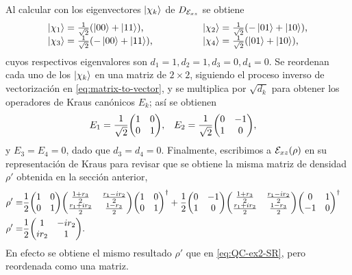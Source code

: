 Al calcular con los eigenvectores $\ket{\chi_k}$ de $D_{\mathcal{E}_{xz}}$ se obtiene
\begin{align}
\begin{tabular}{lcl}
$\ket{\chi_1}=\frac{1}{\sqrt{2}}\qty(\ket{00}+\ket{11})$, & \hspace{1cm}
& $ \ket{\chi_{2}}=\frac{1}{\sqrt{2}}\qty(-\ket{01}+\ket{10})$, \\
$\ket{\chi_{3}}=\frac{1}{\sqrt{2}}\qty(-\ket{00}+\ket{11})$, & \hspace{1cm}
& $\ket{\chi_4}=\frac{1}{\sqrt{2}}\qty(\ket{01}+\ket{10})$,
\end{tabular}
\end{align}
cuyos respectivos eigenvalores son $d_1=1,d_2=1,d_3=0,d_4=0$. 
Se reordenan cada uno de los $\ket{\chi_k}$ en una matriz
de $2\times2$, siguiendo el proceso inverso de vectorización
en \eqref{eq:matrix-to-vector}, y se multiplica por $\sqrt{d_k}$ 
para obtener los operadores de Kraus canónicos $E_k$; así se obtienen
\begin{align}
E_1&=
\frac{1}{\sqrt{2}}
\mqty(
1 & 0\\
0 & 1
),
&
E_2&=
\frac{1}{\sqrt{2}}
\mqty(
0 & -1\\
1 & 0
),
\end{align}
y $E_3=E_4=0$, dado que $d_3=d_4=0$. 
Finalmente, escribimos a $\mathcal{E}_{xz}\qty(\rho)$ en su representación 
de Kraus para revisar que se obtiene la misma matriz
de densidad $\rho'$ obtenida en la sección anterior,
\begin{align}
\rho'=&
\frac{1}{2}
\mqty(
1 & 0\\
0 & 1
)
\mqty(
\frac{1+r_3}{2}& \frac{r_1-ir_2}{2}\\
\frac{r_1+ir_2}{2} & \frac{1-r_3}{2}
)
\mqty(
1 & 0\\
0 & 1
)^{\dagger}
+
\frac{1}{2}
\mqty(
0 & -1\\
1 & 0
)
\mqty(
\frac{1+r_3}{2}& \frac{r_1-ir_2}{2}\\
\frac{r_1+ir_2}{2} & \frac{1-r_3}{2}
)
\mqty(
0 & 1\\
-1 & 0
)^{\dagger}&
\nonumber\\
\rho'=&
\frac{1}{2}
\mqty(
1 & -ir_2\\
ir_2 & 1
).
\label{eq:QC-ex2-KR}
\end{align}
En efecto se obtiene el mismo resultado $\rho'$ que 
en  \eqref{eq:QC-ex2-SR}, pero reordenada como una matriz. 


